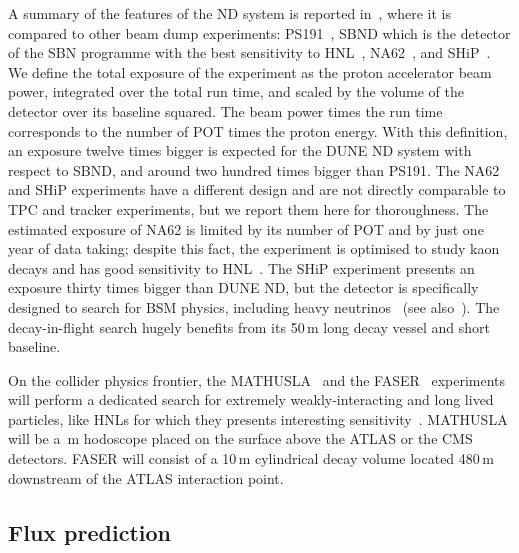 A summary of the features of the ND system is reported in~, where it is compared to other beam dump experiments: %
PS191~\cite{Bernardi:1985ny,Bernardi:1987ek}, SBND which is the detector of the SBN programme with the best sensitivity to %
HNL~\cite{Ballett:2016opr}, NA62~\cite{NA62:2017rwk}, and SHiP~\cite{Anelli:2015pba}.
We define the total exposure of the experiment as the proton accelerator beam power, integrated over the total run time, %
and scaled by the volume of the detector over its baseline squared.
The beam power times the run time corresponds to the number of POT times the proton energy. 
With this definition, an exposure twelve times bigger is expected for the DUNE ND system with respect to SBND, %
and around two hundred times bigger than PS191.
The NA62 and SHiP experiments have a different design and are not directly comparable to TPC and tracker experiments, %
but we report them here for thoroughness.
The estimated exposure of NA62 is limited by its number of POT and by just one year of data taking; %
despite this fact, the experiment is optimised to study kaon decays and has good %
sensitivity to HNL~\cite{Drewes:2018irr}.
The SHiP experiment presents an exposure thirty times bigger than DUNE ND, but the detector is specifically %
designed to search for BSM physics, including heavy neutrinos~\cite{SHiP:2018xqw} (see also~).
The decay-in-flight search hugely benefits from its 50\,m long decay vessel and short baseline.

On the collider physics frontier, the MATHUSLA~\cite{Curtin:2018mvb} and the FASER~\cite{Ariga:2018uku} experiments %
will perform a dedicated search for extremely weakly-interacting and long lived particles, %
like HNLs for which they presents interesting sensitivity~\cite{Curtin:2018mvb, Kling:2018wct}.
MATHUSLA will be a \,m hodoscope placed on the surface above the ATLAS or the CMS detectors.
FASER will consist of a 10\,m cylindrical decay volume located 480\,m downstream of the ATLAS interaction point. 

\subsection{Flux prediction}
\label{sec:tauneutrino}

